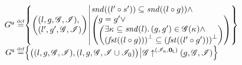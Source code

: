 \begin{definition}[Guarantee]
\[\begin{array}{@{} r @{} l @{}}
	\updateG \eqdef &
 	\left\{
	\begin{array}{@{} l @{\hspace*{2pt}} | @{\hspace*{2pt}} r @{}}
	   	\left(
	   	\begin{array}{@{} l @{}}
	     	(l, g, \gmod, \lmod),\\
	     	(l', g', \gmod, \lmod)
	   	\end{array}
		\right)
	  	&
	  	\begin{array}{@{} l @{} }
	  		\capPart{(l' \composeL s')}  \subseteq \capPart{(l \composeL g)} \land\\
		  	\left(
		  	\begin{array}{@{} l @{} }
		 		g = g' \lor\\
		 	  	\left(
		 	  	\begin{array}{@{} l @{}}
		 	  		\exsts{\ca{} \subseteq \capPart{l}}
		 	  		(g, g') \in \gmod(\ca{}) \land\\
		 	  	
		 	  	\heapSize{\heapPart{\left(l \composeL g\right)}} \subseteq 
		 	  	\heapSize{\heapPart{\left(l' \composeL g'\right)}}
		 	  	\end{array}	
		 	  	\right)
		 	\end{array}
	   		\right)
   		\end{array}
 	\end{array}
	\right\}\\
	
	
	
	\shiftG \eqdef & 
	\left\{
	\begin{array}{@{} l @{\hspace*{2pt}} | @{\hspace*{2pt}} r @{}}
	   \left(
	   \begin{array}{@{} l @{}}
	     (l, g, \gmod, \lmod),
 	     \left( l, g, \gmod, \lmod \cup \lmod_0  \right)
	   \end{array}
 	  \right)
	   &
	   
	   \expandsAM{\gmod}{\lmod_n}{\unitL}{g}{\gmod}{\lmod}
 	\end{array}
	\right\}

\end{array}
\]
%
\end{definition}

